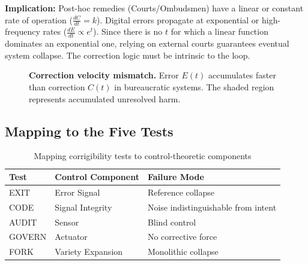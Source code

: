 \textbf{Implication:} Post-hoc remedies (Courts/Ombudsmen) have a linear or constant rate of operation ($\frac{dC}{dt} = k$). Digital errors propagate at exponential or high-frequency rates ($\frac{dE}{dt} \propto e^{t}$). Since there is no $t$ for which a linear function dominates an exponential one, relying on external courts guarantees eventual system collapse. The correction logic must be intrinsic to the loop.

\begin{figure}[htbp]
\centering
{}
\caption{\textbf{Correction velocity mismatch.} Error $E(t)$ accumulates faster than correction $C(t)$ in bureaucratic systems. The shaded region represents accumulated unresolved harm.}
\label{fig:velocity-mismatch}
\end{figure}

\subsection{Mapping to the Five Tests}

\begin{table}[htbp]
\centering
\caption{Mapping corrigibility tests to control-theoretic components}
\label{tab:control-mapping}
\begin{tabular}{lll}
\hline
\textbf{Test} & \textbf{Control Component} & \textbf{Failure Mode} \\
\hline
EXIT & Error Signal & Reference collapse \\
CODE & Signal Integrity & Noise indistinguishable from intent \\
AUDIT & Sensor & Blind control \\
GOVERN & Actuator & No corrective force \\
FORK & Variety Expansion & Monolithic collapse \\
\hline
\end{tabular}
\end{table}

